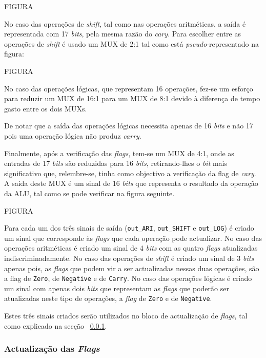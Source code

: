 \documentclass[11pt]{article}
\numberwithin{equation}{section}
\begin{document}
FIGURA

No caso das operações de \textit{shift}, tal como nas operações aritméticas, a saída é representada com 17 \textit{bits}, pela mesma razão do \textit{cary}. Para escolher entre as operações de \textit{shift} é usado um MUX de 2:1 tal como está \textit{pseudo}-representado na figura:

FIGURA

No caso das operações lógicas, que representam 16 operações, fez-se um esforço para reduzir um MUX de 16:1 para um MUX de 8:1 devido à diferença de tempo gasto entre os dois MUXs.

De notar que a saída das operações lógicas necessita apenas de 16 \textit{bits} e não 17 pois uma operação lógica não produz \textit{carry}.

Finalmente, após a verificação das \textit{flags}, tem-se um MUX de 4:1, onde as entradas de 17 \textit{bits} são reduzidas para 16 \textit{bits}, retirando-lhes o \textit{bit} mais significativo que, relembre-se, tinha como objectivo a verificação da flag de \textit{cary}. A saída deste MUX é um sinal de 16 \textit{bits} que representa o resultado da operação da ALU, tal como se pode verificar na figura seguinte.

FIGURA

Para cada um dos três sinais de saída (\texttt{out\_ARI}, \texttt{out\_SHIFT} e \texttt{out\_LOG}) é criado um sinal que corresponde às \textit{flags} que cada operação pode actualizar. No caso das operações aritméticas é criado um sinal de 4 \textit{bits} com as quatro \textit{flags} atualizadas indiscriminadamente. No caso das operações de \textit{shift} é criado um sinal de 3 \textit{bits} apenas pois, as \textit{flags} que podem vir a ser actualizadas nessas duas operações, são a flag de \texttt{Zero}, de \texttt{Negative} e de \texttt{Carry}. No caso das operações lógicas é criado um sinal com apenas dois \textit{bits} que representam as \textit{flags} que poderão ser atualizadas neste tipo de operações, a \textit{flag} de \texttt{Zero} e de \texttt{Negative}.

Estes três sinais criados serão utilizados no bloco de actualização de \textit{flags}, tal como explicado na secção ~\ref{subsec:act-flags}.

\subsubsection{Actualização das \textit{Flags}}
\label{subsec:act-flags}
\end{document}
